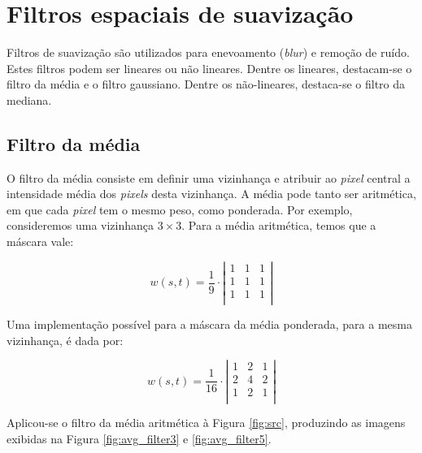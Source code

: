 \documentclass[10pt,a4paper]{article}
\newcommand{\pixel}{\textit{pixel} }
\newcommand{\pixels}{\textit{pixels} }
\begin{document}
\section{Filtros espaciais de suavização}
Filtros de suavização são utilizados para enevoamento (\textit{blur}) e remoção de ruído. Estes filtros podem ser lineares ou não lineares. Dentre os lineares, destacam-se o filtro da média e o filtro gaussiano. Dentre os não-lineares, destaca-se o filtro da mediana.

\subsection{Filtro da média}
O filtro da média consiste em definir uma vizinhança e atribuir ao \pixel central a intensidade média dos \pixels desta vizinhança. A média pode tanto ser aritmética, em que cada \pixel tem o mesmo peso, como ponderada. Por exemplo, consideremos uma vizinhança $3\times3$. Para a média aritmética, temos que a máscara vale:

\[ w(s,t) = \frac{1}{9} \cdot \left|
    \begin{array}{ccc}
        1 & 1 & 1 \\
        1 & 1 & 1 \\
        1 & 1 & 1 \\
\end{array}\right|\]

Uma implementação possível para a máscara da média ponderada, para a mesma vizinhança, é dada por:

\[ w(s,t) = \frac{1}{16} \cdot \left|
    \begin{array}{ccc}
        1 & 2 & 1 \\
        2 & 4 & 2 \\
        1 & 2 & 1 \\
\end{array}\right|\]

Aplicou-se o filtro da média aritmética à Figura \ref{fig:src}, produzindo as imagens exibidas na Figura \ref{fig:avg_filter3} e \ref{fig:avg_filter5}.
\end{document}
